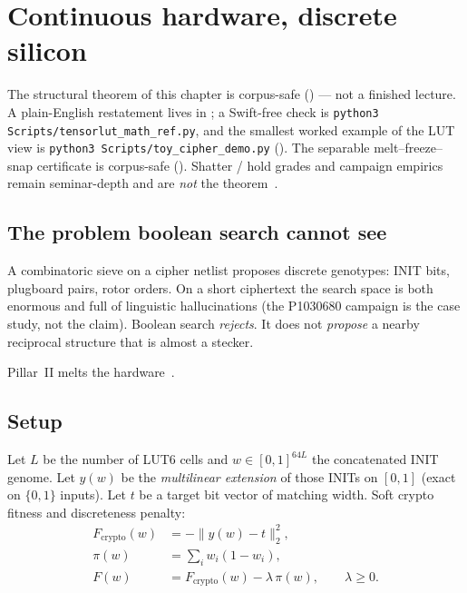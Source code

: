 \chapter{Continuous hardware, discrete silicon}
\label{ch:pillarii}

The structural theorem of this chapter is corpus-safe () --- not a
finished lecture.
A plain-English restatement lives in ;
a Swift-free check is \texttt{python3 Scripts/tensorlut\_math\_ref.py}, and the
smallest worked example of the LUT view is
\texttt{python3 Scripts/toy\_cipher\_demo.py} ().
The separable melt--freeze--snap certificate is corpus-safe ().
Shatter / hold grades and campaign empirics remain seminar-depth and are
\emph{not} the theorem~\cite{helut-tensorlut-thm}.


\section{The problem boolean search cannot see}

A combinatoric sieve on a cipher netlist proposes discrete genotypes:
INIT bits, plugboard pairs, rotor orders.
On a short ciphertext the search space is both enormous and full of
linguistic hallucinations (the P1030680 campaign is the case study, not
the claim).
Boolean search \emph{rejects}.
It does not \emph{propose} a nearby reciprocal structure that is almost a
stecker.

Pillar~II melts the hardware~\cite{helut-paper,helut-tensorlut-thm}.

\section{Setup}

Let $L$ be the number of LUT6 cells and $w\in[0,1]^{64L}$ the concatenated
INIT genome.
Let $y(w)$ be the \emph{multilinear extension} of those INITs on $[0,1]$
(exact on $\{0,1\}$ inputs).
Let $t$ be a target bit vector of matching width.
Soft crypto fitness and discreteness penalty:
\begin{align}
  F_{\mathrm{crypto}}(w)
  &= -\lVert y(w)-t\rVert_2^2, \\
  \pi(w)
  &= \sum_i w_i(1-w_i), \\
  F(w)
  &= F_{\mathrm{crypto}}(w)-\lambda\,\pi(w),
  \qquad \lambda\ge 0.
\end{align}

